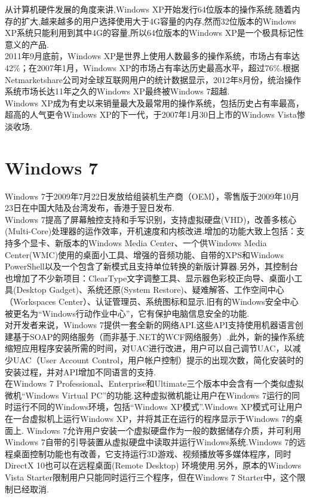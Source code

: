 \documentclass[a4paper,12pt,notitlepage]{article}
\begin{document}
	从计算机硬件发展的角度来讲,Windows XP开始发行64位版本的操作系统.随着内存的扩大,越来越多的用户选择使用大于4G容量的内存,然而32位版本的Windows XP系统只能利用到其中4G的容量,所以64位版本的Windows XP是一个极具标记性意义的产品. \\
	
	2011年9月底前，Windows XP是世界上使用人数最多的操作系统，市场占有率达42\%；在2007年1月，Windows XP的市场占有率达历史最高水平，超过76\%.根据Netmarketshare公司对全球互联网用户的统计数据显示，2012年8月份，统治操作系统市场长达11年之久的Windows XP最终被Windows 7超越. \\

	Windows XP成为有史以来销量最大及最常用的操作系统，包括历史占有率最高，超高的人气更令Windows XP的下一代，于2007年1月30日上市的Windows Vista惨淡收场. \\
	
\section{Windows 7}

	Windows 7于2009年7月22日发放给组装机生产商（OEM），零售版于2009年10月23日在中国大陆及台湾发布，香港于翌日发布. \\
	
	Windows 7提高了屏幕触控支持和手写识别，支持虚拟硬盘(VHD)，改善多核心(Multi-Core)处理器的运作效率，开机速度和内核改进.增加的功能大致上包括：支持多个显卡、新版本的Windows Media Center、一个供Windows Media Center(WMC)使用的桌面小工具、增强的音频功能、自带的XPS和Windows PowerShell以及一个包含了新模式且支持单位转换的新版计算器.另外，其控制台也增加了不少新项目：ClearType文字调整工具、显示器色彩校正向导、桌面小工具(Desktop Gadget)、系统还原(System Restore)、疑难解答、工作空间中心（Workspaces Center）、认证管理员、系统图标和显示.旧有的Windows安全中心被更名为“Windows行动作业中心”，它有保护电脑信息安全的功能. \\
	
	对开发者来说，Windows 7提供一套全新的网络API.这些API支持使用机器语言创建基于SOAP的网络服务（而非基于.NET的WCF网络服务）.此外，新的操作系统缩短应用程序安装所需的时间，对UAC进行改进，用户可以自己调节UAC，以减少UAC（User Account Control，用户帐户控制）提示的出现次数，简化安装时的安装过程，并对API增加不同语言的支持. \\
	
	在Windows 7 Professional、Enterprise和Ultimate三个版本中会含有一个类似虚拟微机“Windows Virtual PC”的功能.这种虚拟微机能让用户在Windows 7运行的同时运行不同的Windows环境，包括“Windows XP模式”.Windows XP模式可让用户在一台虚拟机上运行Windows XP，并将其正在运行的程序显示于Windows 7的桌面上. Windows 7允许用户安装一个虚拟硬盘作为一般的数据储存介质，并可利用Windows 7自带的引导装置从虚拟硬盘中读取并运行Windows系统.Windows 7的远程桌面控制功能也有改善，它支持运行3D游戏、视频播放等多媒体程序，同时DirectX 10也可以在远程桌面(Remote Desktop) 环境使用.另外，原本的Windows Vista Starter限制用户只能同时运行三个程序，但在Windows 7 Starter中，这个限制已经取消. \\
	
\end{document}
